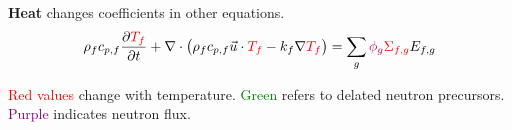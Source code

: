 \begin{frame}
    \textbf{Heat} changes coefficients in other equations.
\begin{equation}
    \rho_fc_{p,f}\frac{\partial \textcolor{red}{T_f}}{\partial t} + \nabla\cdot\left(\rho_f
    c_{p,f} \vec{u}\cdot \textcolor{red}{T_f} -k_f\nabla \textcolor{red}{T_f}\right) = \sum_g \textcolor{purple}{\phi_g} \textcolor{red}{\Sigma_{f,g}} E_{f,g}
  \label{eq:fuel_temp}                                                        				%
\end{equation}                                                                				%

\textcolor{red}{Red values} change with temperature. \textcolor{green}{Green} refers to delated neutron precursors. \textcolor{purple}{Purple} indicates neutron flux.
\end{frame}

